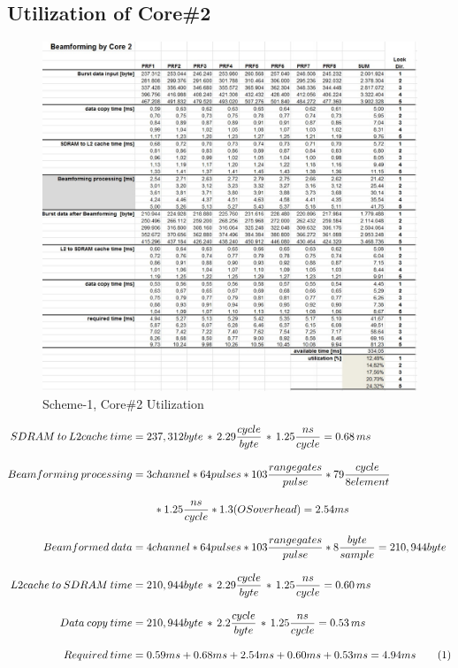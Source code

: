 \subsection{Utilization of Core\#2}
\begin{figure}[h!]
	\centering
	\includegraphics[width=150mm]{figures/aa_scheme1_cpu_util_2}
	\caption{Scheme-1, Core\#2 Utilization}
	\label{fig:existing_analysis:aa_scheme1_cpu_util2}
\end{figure}
\begin{align*}
\label{aa:scheme1:core2:equ1}
	SDRAM \: to \: L2cache \: time &= 237,312 byte \, * \, 2.29\frac{cycle}{byte} \, * \, 1.25\frac{ns}{cycle} = 0.68 \, ms \\[0.3cm]
	Beamforming \: processing &= 3channel * 64pulses * 103 \frac{range gates}{pulse} * 79\frac{cycle}{8 element} \\[0.3cm] 
	&\qquad * 1.25\frac{ns}{cycle} * 1.3(OSoverhead) = 2.54ms\\[0.3cm]
	Beamformed \: data &= 4channel * 64pulses * 103 \frac{range gates}{pulse} *8\frac{byte}{sample} = 210,944byte \\[0.3cm]
	L2cache \: to \: SDRAM \: time &= 210,944 byte \, * \, 2.29\frac{cycle}{byte} \, * \, 1.25\frac{ns}{cycle} = 0.60 \, ms \\[0.3cm]
	Data \: copy \: time &= 210,944 byte \, * \, 2.2\frac{cycle}{byte} \, * \, 1.25\frac{ns}{cycle} = 0.53 \, ms \\[0.3cm]
	Required \: time &= 0.59ms + 0.68ms + 2.54ms + 0.60ms + 0.53ms = 4.94ms \stepcounter{equation}\tag{\theequation} 
\end{align*}


